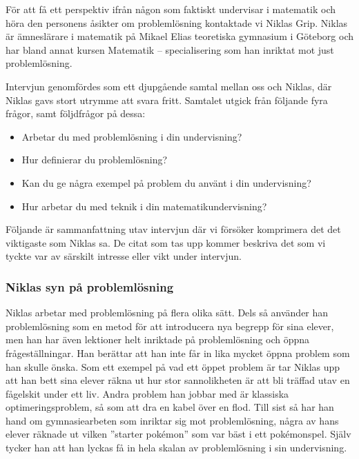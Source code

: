 \textcolor{turkos}{
För att få ett perspektiv ifrån någon som faktiskt undervisar i matematik och höra den personens åsikter om problemlösning kontaktade vi Niklas Grip. Niklas är ämneslärare i matematik på Mikael Elias teoretiska gymnasium i Göteborg och har bland annat kursen Matematik – specialisering som han inriktat mot just problemlösning.
}

\textcolor{turkos}{
Intervjun genomfördes som ett djupgående samtal mellan oss och Niklas, där Niklas gavs stort utrymme att svara fritt. Samtalet utgick från följande fyra frågor, samt följdfrågor på dessa: 
}
\begin{itemize}
  \item \textcolor{turkos}{Arbetar du med problemlösning i din undervisning?}
  \item \textcolor{turkos}{Hur definierar du problemlösning?}
  \item \textcolor{turkos}{Kan du ge några exempel på problem du använt i din undervisning?}
  \item \textcolor{turkos}{Hur arbetar du med teknik i din matematikundervisning?}
\end{itemize}

\noindent \textcolor{turkos}{
Följande är sammanfattning utav intervjun där vi försöker komprimera det det viktigaste som Niklas sa. De citat som tas upp kommer beskriva det som vi tyckte var av särskilt intresse eller vikt under intervjun. 
}

\subsubsection{Niklas syn på problemlösning}
\label{sec:Niklassyn}

\textcolor{turkos}{
Niklas arbetar med problemlösning på flera olika sätt. Dels så använder han problemlösning som en metod för att introducera nya begrepp för sina elever, men han har även lektioner helt inriktade på problemlösning och öppna frågeställningar. Han berättar att han inte får in lika mycket öppna problem som han skulle önska. Som ett exempel på vad ett öppet problem är tar Niklas upp att han bett sina elever räkna ut hur stor sannolikheten är att bli träffad utav en fågelskit under ett liv. Andra problem han jobbar med är klassiska optimeringsproblem, så som att dra en kabel över en flod. Till sist så har han hand om gymnasiearbeten som inriktar sig mot problemlösning, några av hans elever räknade ut vilken ''starter pokémon'' som var bäst i ett pokémonspel. Själv tycker han att han lyckas få in hela skalan av problemlösning i sin undervisning.
}

